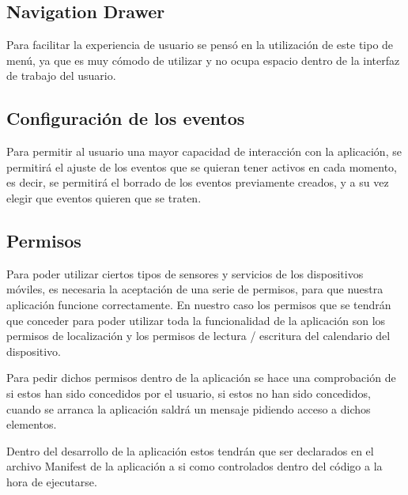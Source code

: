 \subsection{Navigation Drawer}
Para facilitar la experiencia de usuario se pensó en la utilización de este tipo de menú, ya que es muy cómodo de utilizar y no ocupa espacio dentro de la interfaz de trabajo del usuario.

\subsection{Configuración de los eventos}
Para permitir al usuario una mayor capacidad de interacción con la aplicación, se permitirá el ajuste de los eventos que se quieran tener activos en cada momento, es decir, se permitirá el borrado de los eventos previamente creados, y a su vez elegir que eventos quieren que se traten.

\subsection{Permisos}
Para poder utilizar ciertos tipos de sensores y servicios de los dispositivos móviles, es necesaria la aceptación de una serie de permisos, para que nuestra aplicación funcione correctamente. En nuestro caso los permisos que se tendrán que conceder para poder utilizar toda la funcionalidad de la aplicación son los permisos de localización y los permisos de lectura / escritura del calendario del dispositivo.

Para pedir dichos permisos dentro de la aplicación se hace una comprobación de si estos han sido concedidos por el usuario, si estos no han sido concedidos, cuando se arranca la aplicación saldrá un mensaje pidiendo acceso a dichos elementos.

Dentro del desarrollo de la aplicación estos tendrán que ser declarados en el archivo Manifest de la aplicación a si como controlados dentro del código a la hora de ejecutarse.
